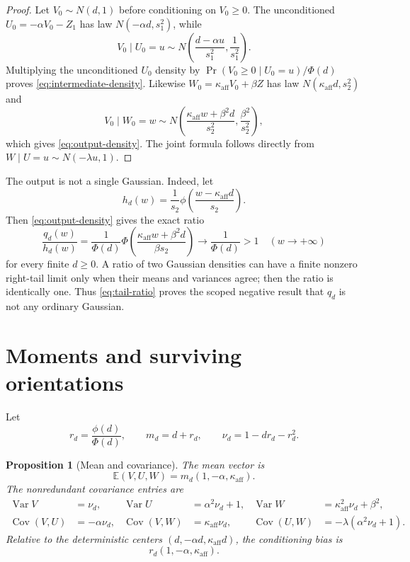 \documentclass[11pt]{article}
\newtheorem{proposition}[theorem]{Proposition}
\theoremstyle{remark}
\newcommand{\ka}{\kappa_{\mathrm{aff}}}
\begin{document}
\begin{proof}
Let $V_0\sim N(d,1)$ before conditioning on $V_0\ge0$.  The unconditioned
$U_0=-\alpha V_0-Z_1$ has law $N(-\alpha d,s_1^2)$, while
\[
 V_0\mid U_0=u
 \sim N\!\left(\frac{d-\alpha u}{s_1^2},\frac1{s_1^2}\right).
\]
Multiplying the unconditioned $U_0$ density by
$\Pr(V_0\ge0\mid U_0=u)/\Phi(d)$ proves
\eqref{eq:intermediate-density}.  Likewise
$W_0=\ka V_0+\beta Z$ has law $N(\ka d,s_2^2)$ and
\[
 V_0\mid W_0=w
 \sim N\!\left(
 \frac{\ka w+\beta^2d}{s_2^2},
 \frac{\beta^2}{s_2^2}
 \right),
\]
which gives \eqref{eq:output-density}.  The joint formula follows directly
from $W\mid U=u\sim N(-\lambda u,1)$.
\end{proof}

The output is not a single Gaussian.  Indeed, let
\[
 h_d(w)=\frac1{s_2}\phi\!\left(\frac{w-\ka d}{s_2}\right).
\]
Then \eqref{eq:output-density} gives the exact ratio
\begin{equation}\label{eq:tail-ratio}
 \frac{q_d(w)}{h_d(w)}
 =\frac1{\Phi(d)}
 \Phi\!\left(\frac{\ka w+\beta^2d}{\beta s_2}\right)
 \longrightarrow\frac1{\Phi(d)}>1
 \quad(w\to+\infty)
\end{equation}
for every finite $d\ge0$.  A ratio of two Gaussian densities can have a
finite nonzero right-tail limit only when their means and variances agree;
then the ratio is identically one.  Thus \eqref{eq:tail-ratio} proves the
scoped negative result that $q_d$ is not any ordinary Gaussian.

\section{Moments and surviving orientations}

Let
\begin{equation}\label{eq:mills}
 r_d=\frac{\phi(d)}{\Phi(d)},
 \qquad m_d=d+r_d,
 \qquad \nu_d=1-dr_d-r_d^2.
\end{equation}

\begin{proposition}[Mean and covariance]\label{prop:moments}
The mean vector is
\begin{equation}\label{eq:mean-vector}
 \mathbb E(V,U,W)=m_d(1,-\alpha,\ka).
\end{equation}
The nonredundant covariance entries are
\begin{align}
 \operatorname{Var}V&=\nu_d,&
 \operatorname{Var}U&=\alpha^2\nu_d+1,&
 \operatorname{Var}W&=\ka^2\nu_d+\beta^2,
 \label{eq:variances}\\
 \operatorname{Cov}(V,U)&=-\alpha\nu_d,&
 \operatorname{Cov}(V,W)&=\ka\nu_d,&
 \operatorname{Cov}(U,W)&=-\lambda(\alpha^2\nu_d+1).
 \label{eq:covariances}
\end{align}
Relative to the deterministic centers $(d,-\alpha d,\ka d)$, the
conditioning bias is
\begin{equation}\label{eq:bias}
 r_d(1,-\alpha,\ka).
\end{equation}
\end{proposition}
\end{document}
